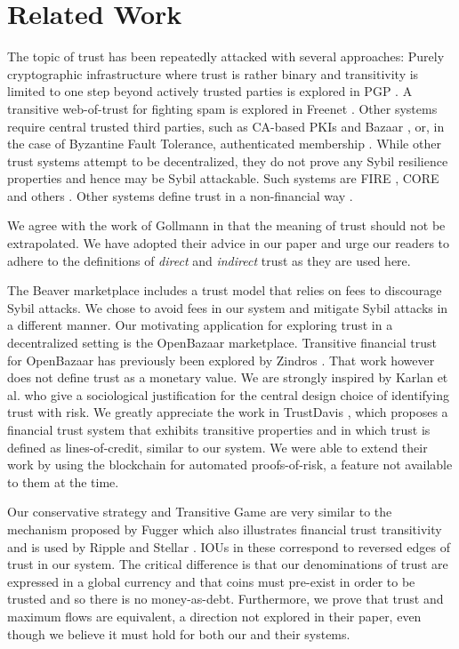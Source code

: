 \section{Related Work}
  The topic of trust has been repeatedly attacked with several approaches: Purely cryptographic infrastructure where trust
  is rather binary and transitivity is limited to one step beyond actively trusted parties is explored in PGP \cite{pgp}. A
  transitive web-of-trust for fighting spam is explored in Freenet \cite{freenet}. Other systems require central trusted
  third parties, such as CA-based PKIs \cite{pki} and Bazaar \cite{bazaar}, or, in the case of Byzantine Fault Tolerance,
  authenticated membership \cite{byzantine}. While other trust systems attempt to be decentralized, they do not prove any
  Sybil resilience properties and hence may be Sybil attackable. Such systems are FIRE \cite{fire}, CORE \cite{core} and
  others \cite{openrep,ghkkw,rk}. Other systems define trust in a non-financial way
  \cite{mui,beta,pace,vpc,sdt,wot,pathfinder}.

  We agree with the work of Gollmann \cite{badtrust} in that the meaning of trust should not be extrapolated. We have adopted
  their advice in our paper and urge our readers to adhere to the definitions of \textit{direct} and \textit{indirect} trust
  as they are used here.

  The Beaver marketplace \cite{beaver} includes a trust model that relies on fees to discourage Sybil attacks. We chose to
  avoid fees in our system and mitigate Sybil attacks in a different manner.  Our motivating application for exploring trust
  in a decentralized setting is the OpenBazaar marketplace. Transitive financial trust for OpenBazaar has previously been
  explored by Zindros \cite{dionyziz}. That work however does not define trust as a monetary value. We are strongly inspired
  by Karlan et al. \cite{kmrs} who give a sociological justification for the central design choice of identifying trust with
  risk. We greatly appreciate the work in TrustDavis \cite{davis}, which proposes a financial trust system that exhibits
  transitive properties and in which trust is defined as lines-of-credit, similar to our system. We were able to extend their
  work by using the blockchain for automated proofs-of-risk, a feature not available to them at the time.

  Our conservative strategy and Transitive Game are very similar to the mechanism proposed by Fugger \cite{iou} which also
  illustrates financial trust transitivity and is used by Ripple \cite{ripple} and Stellar \cite{stellar}. IOUs in these
  correspond to reversed edges of trust in our system. The critical difference is that our denominations of trust are
  expressed in a global currency and that coins must pre-exist in order to be trusted and so there is no money-as-debt.
  Furthermore, we prove that trust and maximum flows are equivalent, a direction not explored in their paper, even though we
  believe it must hold for both our and their systems.
